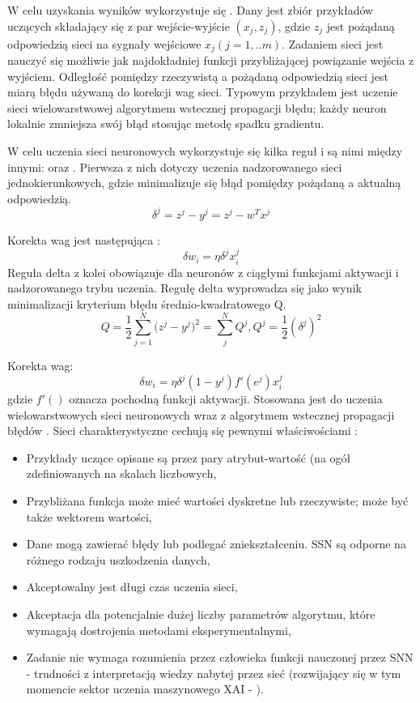 W celu uzyskania wyników wykorzystuje się . Dany jest zbiór przykładów uczących składający się z par wejście-wyjście $(x_{j}, z_{j})$, gdzie $z_{j}$ jest pożądaną odpowiedzią sieci na sygnały wejściowe $x_{j} (j=1,..m)$. Zadaniem sieci jest nauczyć się możliwie jak najdokładniej funkcji przybliżającej powiązanie wejścia z wyjściem. Odległość pomiędzy rzeczywistą a pożądaną odpowiedzią sieci jest
miarą błędu używaną do korekcji wag sieci. Typowym przykładem jest uczenie sieci wielowarstwowej algorytmem wstecznej propagacji błędu; każdy neuron lokalnie zmniejsza swój błąd stosując metodę spadku gradientu.

W celu uczenia sieci neuronowych wykorzystuje się kilka reguł i są nimi między innymi:  oraz . Pierwsza z nich dotyczy uczenia nadzorowanego sieci jednokierunkowych, gdzie minimalizuje się błąd pomiędzy pożądaną a aktualną odpowiedzią. 
\[
\delta^{j} = z^{j} - y^{j} = z^{j} - w^{T}x^{j}
\]

Korekta wag jest następująca \cite{Widrow}:
\begin{equation}
\label{eqn:delta}
\delta w_{i} = \eta \delta^{j} x^{j}_{i}
\end{equation}
Reguła delta z kolei obowiązuje dla neuronów z ciągłymi funkcjami aktywacji i nadzorowanego trybu uczenia. Regułę delta wyprowadza się jako wynik minimalizacji kryterium błędu średnio-kwadratowego Q.
\[
    Q = \frac{1}{2}\sum_{j=1}^{N} \big( z^{j} - y^{j}\big)^{2} = \sum_{j}^{N}Q^{j}, Q^{j} = \frac{1}{2}(\delta^{j})^{2}
\]

Korekta wag:
\[
\delta w_{i} = \eta \delta^{j} (1 - y^{j}) f'(e^{j}) x^{j}_{i}
\]
gdzie $f'()$ oznacza pochodną funkcji aktywacji. Stosowana jest do uczenia wielowarstwowych sieci neuronowych wraz z algorytmem wstecznej propagacji błędów \cite{Rumelhart}. Sieci charakterystyczne cechują się pewnymi właściwościami \cite{Mitchell}:
\begin{itemize}
    \item Przykłady uczące opisane są przez pary atrybut-wartość (na ogół
zdefiniowanych na skalach liczbowych,
    \item Przybliżana funkcja może mieć wartości dyskretne lub rzeczywiste;
może być także wektorem wartości,
 \item Dane mogą zawierać błędy lub podlegać zniekształceniu. SSN są
odporne na różnego rodzaju uszkodzenia danych, 
    \item Akceptowalny jest długi czas uczenia sieci,
    \item Akceptacja dla potencjalnie dużej liczby parametrów algorytmu,
które wymagają dostrojenia metodami eksperymentalnymi,
    \item Zadanie nie wymaga rozumienia przez człowieka funkcji
nauczonej przez SNN - trudności z interpretacją wiedzy nabytej
przez sieć (rozwijający się w tym momencie sektor uczenia maszynowego XAI - ).
\end{itemize}

